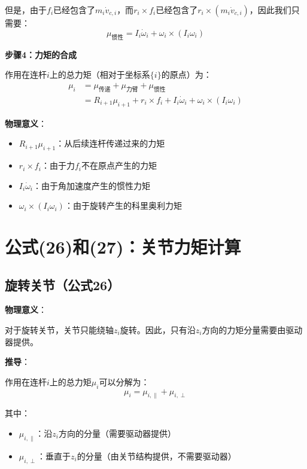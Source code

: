\documentclass[12pt,a4paper]{article}
\begin{document}
但是，由于$f_i$已经包含了$m_i \dot{v}_{c,i}$，而$r_i \times f_i$已经包含了$r_i \times (m_i \dot{v}_{c,i})$，因此我们只需要：
\begin{equation}
\mu_{\text{惯性}} = I_i \dot{\omega}_i + \omega_i \times (I_i \omega_i)
\end{equation}

\textbf{步骤4：力矩的合成}

作用在连杆$i$上的总力矩（相对于坐标系$\{i\}$的原点）为：
\begin{align}
\mu_i &= \mu_{\text{传递}} + \mu_{\text{力臂}} + \mu_{\text{惯性}} \\
&= R_{i+1} \mu_{i+1} + r_i \times f_i + I_i \dot{\omega}_i + \omega_i \times (I_i \omega_i) \tag{25}
\end{align}

\textbf{物理意义}：
\begin{itemize}
\item $R_{i+1} \mu_{i+1}$：从后续连杆传递过来的力矩
\item $r_i \times f_i$：由于力$f_i$不在原点产生的力矩
\item $I_i \dot{\omega}_i$：由于角加速度产生的惯性力矩
\item $\omega_i \times (I_i \omega_i)$：由于旋转产生的科里奥利力矩
\end{itemize}

\section{公式(26)和(27)：关节力矩计算}

\subsection{旋转关节（公式26）}

\textbf{物理意义}：

对于旋转关节，关节只能绕轴$z_i$旋转。因此，只有沿$z_i$方向的力矩分量需要由驱动器提供。

\textbf{推导}：

作用在连杆$i$上的总力矩$\mu_i$可以分解为：
\begin{equation}
\mu_i = \mu_{i,\parallel} + \mu_{i,\perp}
\end{equation}

其中：
\begin{itemize}
\item $\mu_{i,\parallel}$：沿$z_i$方向的分量（需要驱动器提供）
\item $\mu_{i,\perp}$：垂直于$z_i$的分量（由关节结构提供，不需要驱动器）
\end{itemize}
\end{document}

